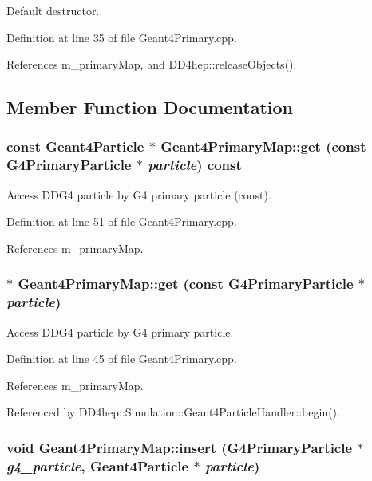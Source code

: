 Default destructor. 

Definition at line 35 of file Geant4Primary.cpp.

References m\_\-primaryMap, and DD4hep::releaseObjects().

\subsection{Member Function Documentation}
\hypertarget{class_d_d4hep_1_1_simulation_1_1_geant4_primary_map_ae787c8c255966394d5c222fdee02e0c7}{
\subsubsection[{get}]{\setlength{\rightskip}{0pt plus 5cm}const {\bf Geant4Particle} $\ast$ Geant4PrimaryMap::get (const G4PrimaryParticle $\ast$ {\em particle}) const}}
\label{class_d_d4hep_1_1_simulation_1_1_geant4_primary_map_ae787c8c255966394d5c222fdee02e0c7}


Access DDG4 particle by G4 primary particle (const). 

Definition at line 51 of file Geant4Primary.cpp.

References m\_\-primaryMap.\hypertarget{class_d_d4hep_1_1_simulation_1_1_geant4_primary_map_a4b4f4c2acc5258bdf1cc2b1c9aa735d9}{
\subsubsection[{get}]{ $\ast$ Geant4PrimaryMap::get (const G4PrimaryParticle $\ast$ {\em particle})}}
\label{class_d_d4hep_1_1_simulation_1_1_geant4_primary_map_a4b4f4c2acc5258bdf1cc2b1c9aa735d9}


Access DDG4 particle by G4 primary particle. 

Definition at line 45 of file Geant4Primary.cpp.

References m\_\-primaryMap.

Referenced by DD4hep::Simulation::Geant4ParticleHandler::begin().\hypertarget{class_d_d4hep_1_1_simulation_1_1_geant4_primary_map_affe8f0277373092a08624108d677e7f2}{
\subsubsection[{insert}]{\setlength{\rightskip}{0pt plus 5cm}void Geant4PrimaryMap::insert (G4PrimaryParticle $\ast$ {\em g4\_\-particle}, \/  {\bf Geant4Particle} $\ast$ {\em particle})}}
\label{class_d_d4hep_1_1_simulation_1_1_geant4_primary_map_affe8f0277373092a08624108d677e7f2}


